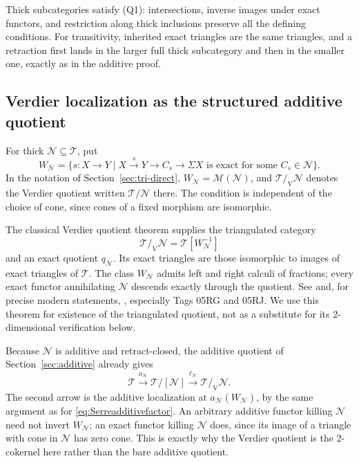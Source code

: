 \documentclass[11pt,reqno,a4paper]{amsart}
\theoremstyle{definition}
\theoremstyle{remark}
\newcommand{\N}{\mathcal{N}}
\newcommand{\T}{\mathcal{T}}
\newcommand{\0}{\mathbf{0}}
\renewcommand{\1}{\mathbf{1}}
\newcommand{\aq}[2]{#1/[#2]}
\newcommand{\vq}[2]{#1/_{\!\mathrm V}#2}
\begin{document}
Thick subcategories satisfy (Q1): intersections, inverse images under
exact functors, and restriction along thick inclusions preserve all the
defining conditions. For transitivity, inherited exact triangles
are the same triangles, and a retraction first lands in the larger full
thick subcategory and then in the smaller one, exactly as in the additive
proof.

\subsection{Verdier localization as the structured additive quotient}

For thick $\N\subseteq\T$, put
\begin{equation}\label{eq:VerdierW}
 W_{\N}=\{s:X\to Y\mid
 X\xrightarrow{s}Y\to C_s\to\Sigma X
 \text{ is exact for some }C_s\in\N\}.
\end{equation}
In the notation of Section~\ref{sec:tri-direct},
$W_{\N}=\mathcal M(\N)$, and $\vq{\T}{\N}$ denotes the
Verdier quotient written $\T/\N$ there.
The condition is independent of the choice of cone, since cones
of a fixed morphism are isomorphic.

The classical Verdier quotient theorem supplies the triangulated category
\begin{equation}\label{eq:Verdierqu}
 \vq{\T}{\N}=\T[W_{\N}^{-1}]
\end{equation}
and an exact quotient $q_{\N}$. Its exact triangles are those
isomorphic to images of exact triangles of $\T$. The class
$W_{\N}$ admits left and right calculi of fractions; every exact
functor annihilating $\N$ descends exactly through the quotient.
See \cite{Verdier} and, for precise modern statements,
\cite[Proposition 13.5.6 and Lemmas 13.6.6--13.6.8]{StacksTri},
especially Tags 05RG and 05RJ. We use this theorem for existence of the
triangulated quotient, not as a substitute for its 2-dimensional
verification below.

Because $\N$ is additive and retract-closed, the additive quotient
of Section~\ref{sec:additive} already gives
\begin{equation}\label{eq:Verdieradditivefactor}
 \T\xrightarrow{a_{\N}}\aq{\T}{\N}
 \xrightarrow{\ell_{\N}}\vq{\T}{\N}.
\end{equation}
The second arrow is the additive localization at $a_{\N}(W_{\N})$,
by the same argument as for \eqref{eq:Serreadditivefactor}.
An arbitrary additive functor killing $\N$ need not invert
$W_{\N}$; an exact functor killing $\N$ does, since its image of a
triangle with cone in $\N$ has zero cone. This is exactly why the
Verdier quotient is the 2-cokernel here rather than the bare additive
quotient.
\end{document}
